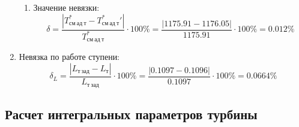 \documentclass[a4paper,10pt]{article}
\begin{document}
\begin{enumerate}
\begin{enumerate}
            \item Значение невязки:
            \[
                \delta = \frac{ \left| T_{см\ ад\ т}^{*} - T_{см\ ад\ т}^*\prime \right| }{T_{см\ ад\ т}^{*}} \cdot 100 \% =
                    \frac{
                        \left| 1175.91 - 1176.05 \right|
                    }{
                        1175.91
                    } \cdot 100 \% =
                0.012 \%
            \]
        \end{enumerate}

        

        \item Невязка по работе ступени:
        \[
            \delta_L = \frac{ \left| L_{т\ зад} - L_т \right| }{ L_{т\ зад} } \cdot 100 \% =
                \frac{
                    \left| 0.1097 - 0.1096 \right|
                }{
                    0.1097 } \cdot 100 \% =
            0.0664 \%
        \]

    \end{enumerate}
     

    \subsection{Расчет интегральных параметров турбины}

    
\end{document}
